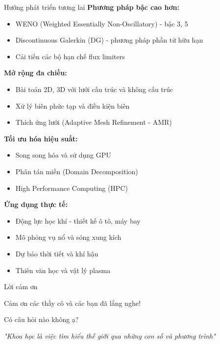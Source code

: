 \documentclass[aspectratio=43,10pt]{beamer}
\begin{document}
\begin{frame}{Hướng phát triển tương lai}
\textbf{Phương pháp bậc cao hơn:}
\begin{itemize}
    \item WENO (Weighted Essentially Non-Oscillatory) - bậc 3, 5
    \item Discontinuous Galerkin (DG) - phương pháp phần tử hữu hạn
    \item Cải tiến các bộ hạn chế flux limiters
\end{itemize}

\textbf{Mở rộng đa chiều:}
\begin{itemize}
    \item Bài toán 2D, 3D với lưới cấu trúc và không cấu trúc
    \item Xử lý biên phức tạp và điều kiện biên
    \item Thích ứng lưới (Adaptive Mesh Refinement - AMR)
\end{itemize}

\textbf{Tối ưu hóa hiệu suất:}
\begin{itemize}
    \item Song song hóa và sử dụng GPU
    \item Phân tán miền (Domain Decomposition)
    \item High Performance Computing (HPC)
\end{itemize}

\textbf{Ứng dụng thực tế:}
\begin{itemize}
    \item Động lực học khí - thiết kế ô tô, máy bay
    \item Mô phỏng vụ nổ và sóng xung kích
    \item Dự báo thời tiết và khí hậu
    \item Thiên văn học và vật lý plasma
\end{itemize}
\end{frame}

\begin{frame}{Lời cảm ơn}
\begin{center}
\Huge Cảm ơn các thầy cô và các bạn đã lắng nghe!

\vspace{1.5cm}

\Large Có câu hỏi nào không ạ?

\vspace{1cm}

\normalsize
\textit{"Khoa học là việc tìm hiểu thế giới qua những con số và phương trình"}
\end{center}
\end{frame}
\end{document}
